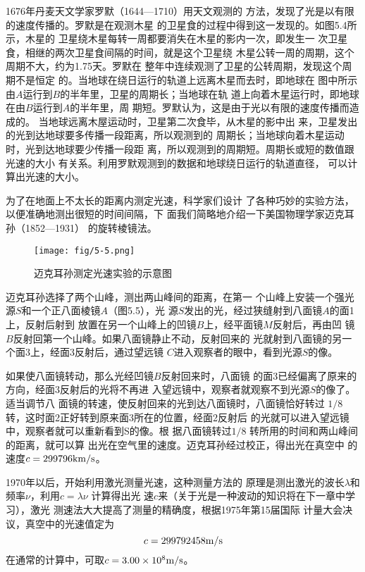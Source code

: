 1676年丹麦天文学家罗默（1644—1710）用天文观测的
方法，发现了光是以有限的速度传播的。罗默是在观测木星
的卫星食的过程中得到这一发现的。如图5.4所示，木星的
卫星绕木星每转一周都要消失在木星的影内一次，即发生一
次卫星食，相继的两次卫星食间隔的时间，就是这个卫星绕
木星公转一周的周期，这个周期不大，约为1.75天。罗默在
整年中连续观测了卫星的公转周期，发现这个周期不是恒定
的。当地球在绕日运行的轨道上远离木星而去时，即地球在
图中所示由$A$运行到$B$的半年里，卫星的周期长；当地球在轨
道上向着木星运行时，即地球在由$B$运行到$A$的半年里，周
期短。罗默认为，这是由于光以有限的速度传播而造成的。
当地球远离木屋运动时，卫星第二次食毕，从木星的影中出
来，卫星发出的光到达地球要多传播一段距离，所以观测到的
周期长；当地球向着木星运动时，光到达地球要少传播一段距
离，所以观测到的周期短。周期长或短的数值跟光速的大小
有关系。利用罗默观测到的数据和地球绕日运行的轨道直径，
可以计算出光速的大小。

为了在地面上不太长的距离内测定光速，科学家们设计
了各种巧妙的实验方法，以便准确地测出很短的时间间隔，下
面我们简略地介绍一下美国物理学家迈克耳孙（1852—1931）
的旋转棱镜法。
\begin{figure}[htp]\centering
    \texttt{[image: fig/5-5.png]}
    \caption{迈克耳孙测定光速实验的示意图}
    \end{figure}

迈克耳孙选择了两个山峰，测出两山峰间的距离，在第一
个山峰上安装一个强光源$S$和一个正八面棱镜$A$（图5.5），光
源$S$发出的光，经过狭缝射到八面镜$A$的面1上，反射后射到
放置在另一个山峰上的凹镜$B$上，经平面镜$M$反射后，再由凹
镜$B$反射回第一个山峰。如果八面镜静止不动，反射回来的
光就射到八面镜的另一个面3上，经面3反射后，通过望远镜
$C$进入观察者的眼中，看到光源$S$的像。

如果使八面镜转动，那么光经凹镜$B$反射回来时，八面镜
的面3已经偏离了原来的方向，经面3反射后的光将不再进
入望远镜中，观察者就观察不到光源$S$的像了。适当调节八
面镜的转速，使反射回来的光到达八面镜时，八面镜恰好转过
$1/8$转，这时面2正好转到原来面3所在的位置，经面2反射后
的光就可以进入望远镜中，观察者就可以重新看到S的像。根
据八面镜转过$1/8$
转所用的时间和两山峰间的距离，就可以算
出光在空气里的速度。迈克耳孙经过校正，得出光在真空中
的速度$c=299796{\rm km}/{\rm s}$。

1970年以后，开始利用激光测量光速，这种测量方法的
原理是测出激光的波长$\lambda$和频率$\nu$，利用$c=\lambda\nu$ 计算得出光
速$c$来（关于光是一种波动的知识将在下一章中学习），激光
测速法大大提高了测量的精确度，根据1975年第15届国际
计量大会决议，真空中的光速值定为
$$c=299792458\text{m}/\text{s}$$
在通常的计算中，可取$c=3.00\times10^8\text{m}/\text{s}$。

